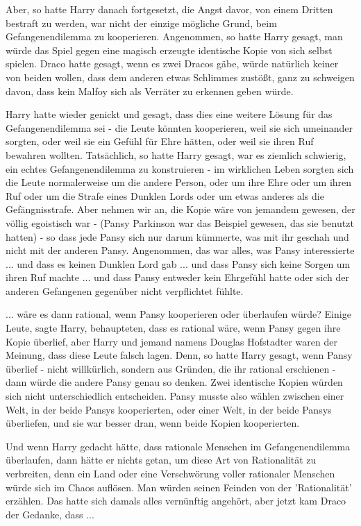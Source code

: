 Aber, so hatte Harry danach fortgesetzt, die Angst davor, von einem Dritten
bestraft zu werden, war nicht der einzige mögliche Grund, beim Gefangenendilemma
zu kooperieren. Angenommen, so hatte Harry gesagt, man würde das Spiel gegen
eine magisch erzeugte identische Kopie von sich selbst spielen. Draco hatte
gesagt, wenn es zwei Dracos gäbe, würde natürlich keiner von beiden wollen, dass
dem anderen etwas Schlimmes zustößt, ganz zu schweigen davon, dass kein Malfoy
sich als Verräter zu erkennen geben würde.

Harry hatte wieder genickt und gesagt, dass dies eine weitere Lösung für das
Gefangenendilemma sei - die Leute könnten kooperieren, weil sie sich umeinander
sorgten, oder weil sie ein Gefühl für Ehre hätten, oder weil sie ihren Ruf
bewahren wollten. Tatsächlich, so hatte Harry gesagt, war es ziemlich schwierig,
ein echtes Gefangenendilemma zu konstruieren - im wirklichen Leben sorgten sich
die Leute normalerweise um die andere Person, oder um ihre Ehre oder um ihren
Ruf oder um die Strafe eines Dunklen Lords oder um etwas anderes als die
Gefängnisstrafe. Aber nehmen wir an, die Kopie wäre von jemandem gewesen, der
völlig egoistisch war - (Pansy Parkinson war das Beispiel gewesen, das sie
benutzt hatten) - so dass jede Pansy sich nur darum kümmerte, was mit ihr
geschah und nicht mit der anderen Pansy. Angenommen, das war alles, was Pansy
interessierte ... und dass es keinen Dunklen Lord gab ... und dass Pansy sich
keine Sorgen um ihren Ruf machte ... und dass Pansy entweder kein Ehrgefühl hatte
oder sich der anderen Gefangenen gegenüber nicht verpflichtet fühlte.

... wäre es dann rational, wenn Pansy kooperieren oder überlaufen würde? Einige
Leute, sagte Harry, behaupteten, dass es rational wäre, wenn Pansy gegen ihre
Kopie überlief, aber Harry und jemand namens Douglas Hofstadter waren der
Meinung, dass diese Leute falsch lagen. Denn, so hatte Harry gesagt, wenn Pansy
überlief - nicht willkürlich, sondern aus Gründen, die ihr rational erschienen -
dann würde die andere Pansy genau so denken. Zwei identische Kopien würden sich
nicht unterschiedlich entscheiden. Pansy musste also wählen zwischen einer Welt,
in der beide Pansys kooperierten, oder einer Welt, in der beide Pansys
überliefen, und sie war besser dran, wenn beide Kopien kooperierten.

Und wenn Harry gedacht hätte, dass \glqq{}rationale\grqq{} Menschen im
Gefangenendilemma überlaufen, dann hätte er nichts getan, um diese Art von \glqq{}
Rationalität\grqq{} zu verbreiten, denn ein Land oder eine Verschwörung voller
\glqq{}rationaler\grqq{} Menschen würde sich im Chaos auflösen. Man würden seinen
Feinden von der 'Rationalität' erzählen. Das hatte sich damals alles vernünftig
angehört, aber jetzt kam Draco der Gedanke, dass ...

